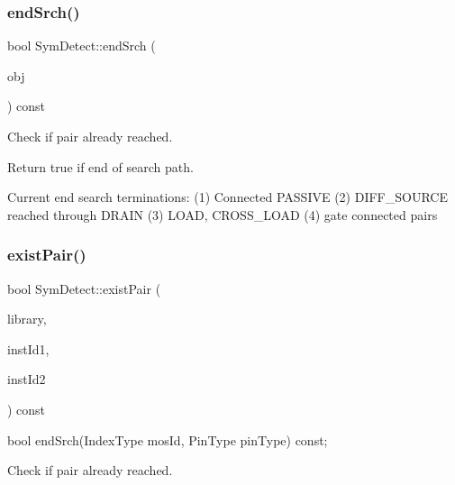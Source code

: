 \subsubsection{\texorpdfstring{end\+Srch()}{endSrch()}}
{\footnotesize\ttfamily bool Sym\+Detect\+::end\+Srch (\begin{DoxyParamCaption}\item[{\hyperlink{classMosPair}{Mos\+Pair} \&}]{obj }\end{DoxyParamCaption}) const\hspace{0.3cm}{\ttfamily [private]}}



Check if pair already reached. 

Return true if end of search path.

Current end search terminations\+: (1) Connected P\+A\+S\+S\+I\+VE (2) D\+I\+F\+F\+\_\+\+S\+O\+U\+R\+CE reached through D\+R\+A\+IN (3) L\+O\+AD, C\+R\+O\+S\+S\+\_\+\+L\+O\+AD (4) gate connected pairs \mbox{\label{classSymDetect_a245b48760c705d4ad9b2bad39012030e}} 
\subsubsection{\texorpdfstring{exist\+Pair()}{existPair()}\hspace{0.1cm}{\footnotesize\ttfamily [1/2]}}
{\footnotesize\ttfamily bool Sym\+Detect\+::exist\+Pair (\begin{DoxyParamCaption}\item[{std\+::vector$<$ \hyperlink{classMosPair}{Mos\+Pair} $>$ \&}]{library,  }\item[{\hyperlink{type_8h_a581e8093e28e7362f2b6937296190676}{Index\+Type}}]{inst\+Id1,  }\item[{\hyperlink{type_8h_a581e8093e28e7362f2b6937296190676}{Index\+Type}}]{inst\+Id2 }\end{DoxyParamCaption}) const\hspace{0.3cm}{\ttfamily [private]}}



bool end\+Srch(\+Index\+Type mos\+Id, Pin\+Type pin\+Type) const; 

Check if pair already reached. \mbox{\label{classSymDetect_a72b24ce0ad3992c207f5023250dd1d5a}} 
